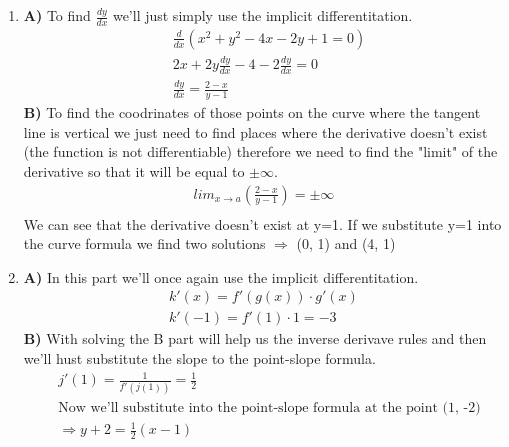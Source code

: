 \documentclass[13pt, a4paper, twoside]{article}
\begin{document}
\begin{enumerate}
    \item \textbf{A)} To find $\frac{dy}{dx}$ we'll just simply use the implicit differentitation.\\
    \begin{align*}
       &\frac{d}{dx}(x^2+y^2-4x -2y + 1 = 0)\\
       &2x + 2y\frac{dy}{dx} - 4 -2\frac{dy}{dx} = 0\\
       &\frac{dy}{dx} = \frac{2-x}{y-1}
    \end{align*}
    \textbf{B)} To find the coodrinates of those points on the curve where
    the tangent line is vertical we just need to find places where the derivative
    doesn't exist (the function is not differentiable) therefore we need to find the "limit" of the derivative so that
    it will be equal to $\pm \infty$.
    \begin{align*}
        lim_{x\to a} (\frac{2-x}{y-1}) = \pm \infty \\
    \end{align*}
    We can see that the derivative doesn't exist at y=1. If we substitute
    y=1 into the curve formula we find two solutions $\Rightarrow$ (0, 1) and (4, 1)

    \item \textbf{A)} In this part we'll once again use the implicit differentitation.
    \begin{align*}
        k'(x) = f'(g(x))\cdot g'(x)\\
        k'(-1) = f'(1) \cdot 1 = -3
    \end{align*}
    \textbf{B)} With solving the B part will help us the inverse derivave rules and then we'll hust substitute the slope to the point-slope formula.
    \begin{align*}
        &j'(1) = \frac{1}{f'(j(1))} = \frac{1}{2}\\
        &\text{Now we'll substitute into the point-slope formula at the point (1, -2)}\\
        &\Rightarrow y+2 = \frac{1}{2}(x-1)
    \end{align*}
\end{enumerate}
\end{document}
